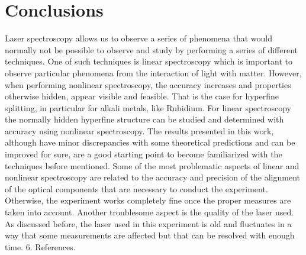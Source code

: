 \documentclass[openany,11pt,a4paper]{book}
\begin{document}
\chapter{Conclusions}





Laser spectroscopy allows us to observe a series of phenomena that would normally not be possible to observe and study by performing a series of different techniques. One of such techniques is linear spectroscopy which is important to observe particular phenomena from the interaction of light with matter. However, when performing nonlinear spectroscopy, the accuracy increases and properties otherwise hidden, appear visible and feasible. That is the case for hyperfine splitting, in particular for alkali metals, like Rubidium. For linear spectroscopy the normally hidden hyperfine structure can be studied and determined with accuracy using nonlinear spectroscopy.
The results presented in this work, although have minor discrepancies with some theoretical predictions and can be improved for sure, are a good starting point to become familiarized with the techniques before mentioned.
Some of the most problematic aspects of linear and nonlinear spectroscopy are related to the accuracy and precision of the alignment of the optical components that are necessary to conduct the experiment. Otherwise, the experiment works completely fine once the proper measures are taken into account. Another troublesome aspect is the quality of the laser used. As discussed before, the laser used in this experiment is old and fluctuates in a way that some measurements are affected but that can be resolved with enough time.
6. References.
\end{document}
